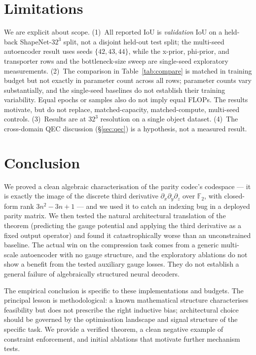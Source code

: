 \documentclass[11pt,a4paper]{article}
\begin{document}
\section{Limitations}
\label{sec:limitations}

We are explicit about scope. (1)~All reported IoU is \emph{validation}
IoU on a held-back ShapeNet-$32^3$ split, not a disjoint held-out test
split; the multi-seed autoencoder result uses seeds $\{42,43,44\}$,
while the x-prior, phi-prior, and transporter rows and the
bottleneck-size sweep are single-seed exploratory measurements.
(2)~The comparison in Table~\ref{tab:compare} is
matched in training budget but not exactly in parameter count across all
rows; parameter counts vary substantially, and the single-seed baselines
do not establish their training variability. Equal epochs or samples
also do not imply equal FLOPs. The results motivate, but do not replace,
matched-capacity, matched-compute, multi-seed controls. (3)~Results are at $32^3$ resolution on a single
object dataset. (4)~The cross-domain QEC discussion
(\S\ref{sec:qec}) is a hypothesis, not a measured result.

\section{Conclusion}

We proved a clean algebraic characterisation of the parity codec's
codespace --- it is exactly the image of the discrete third derivative
$\partial_x \partial_y \partial_z$ over $\mathbb{F}_2$, with closed-form
rank $3n^2 - 3n + 1$ --- and we used it to catch an indexing bug in a
deployed parity matrix. We then tested the natural architectural
translation of the theorem (predicting the gauge potential and applying
the third derivative as a fixed output operator) and found it
catastrophically worse than an unconstrained baseline. The actual win on
the compression task comes from a generic multi-scale autoencoder with
no gauge structure, and the exploratory ablations do not show a benefit from the tested
auxiliary gauge losses. They do not establish a general failure of
algebraically structured neural decoders.

The empirical conclusion is specific to these implementations and budgets.
The principal lesson is methodological: a known mathematical structure
characterises feasibility but does not prescribe the right inductive
bias; architectural choice should be governed by the optimisation
landscape and signal structure of the specific task. We provide a
verified theorem, a clean negative example of constraint enforcement,
and initial ablations that motivate further mechanism tests.
\end{document}
